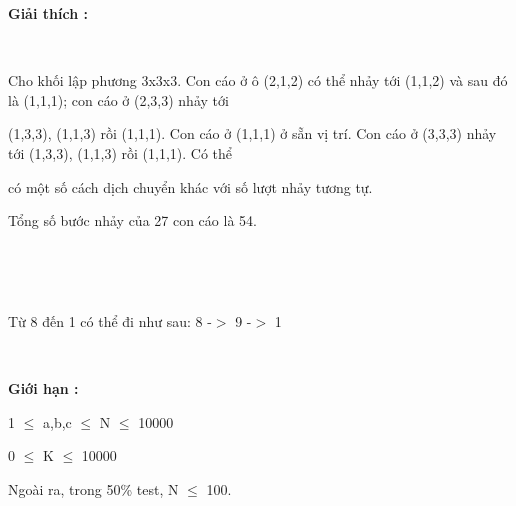 \textbf{Giải thích : }

 

Cho khối lập phương 3x3x3. Con cáo ở ô (2,1,2) có thể nhảy tới (1,1,2) và sau đó là (1,1,1); con cáo ở (2,3,3) nhảy tới

(1,3,3), (1,1,3) rồi (1,1,1). Con cáo ở (1,1,1) ở sẵn vị trí. Con cáo ở (3,3,3) nhảy tới (1,3,3), (1,1,3) rồi (1,1,1). Có thể

có một số cách dịch chuyển khác với số lượt nhảy tương tự.

Tổng số bước nhảy của 27 con cáo là 54.

 

 

Từ 8 đến 1 có thể đi như sau: 8 -$>$ 9 -$>$ 1

 

\textbf{Giới hạn : }

1 $\le$ a,b,c $\le$ N $\le$ 10000

0 $\le$ K $\le$ 10000

Ngoài ra, trong 50\% test, N $\le$ 100.
